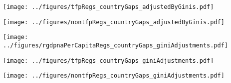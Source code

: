 \documentclass[12pt,english]{article}
\theoremstyle{remark}
\begin{document}
\begin{sidewaysfigure}
	\centering
	\texttt{[image: ../figures/tfpRegs\_countryGaps\_adjustedByGinis.pdf]}
	\caption{} 
\end{sidewaysfigure}

\begin{sidewaysfigure}
	\centering
	\texttt{[image: ../figures/nontfpRegs\_countryGaps\_adjustedByGinis.pdf]}
	\caption{} 
\end{sidewaysfigure}



\begin{sidewaysfigure}
	\centering
	\texttt{[image: ../figures/rgdpnaPerCapitaRegs\_countryGaps\_giniAdjustments.pdf]}
	\caption{} 
\end{sidewaysfigure}

\begin{sidewaysfigure}
	\centering
	\texttt{[image: ../figures/tfpRegs\_countryGaps\_giniAdjustments.pdf]}
	\caption{} 
\end{sidewaysfigure}

\begin{sidewaysfigure}
	\centering
	\texttt{[image: ../figures/nontfpRegs\_countryGaps\_giniAdjustments.pdf]}
	\caption{} 
\end{sidewaysfigure}
\end{document}
